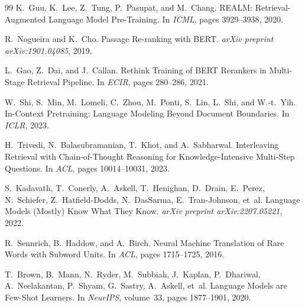 \documentclass[11pt,a4paper]{article}
\theoremstyle{plain}
\theoremstyle{definition}
\begin{document}
\begin{thebibliography}{99}
K.~Guu, K.~Lee, Z.~Tung, P.~Pasupat, and M.~Chang.
\newblock REALM: Retrieval-Augmented Language Model Pre-Training.
\newblock In \emph{ICML}, pages 3929--3938, 2020.

R.~Nogueira and K.~Cho.
\newblock Passage Re-ranking with BERT.
\newblock \emph{arXiv preprint arXiv:1901.04085}, 2019.

L.~Gao, Z.~Dai, and J.~Callan.
\newblock Rethink Training of BERT Rerankers in Multi-Stage Retrieval Pipeline.
\newblock In \emph{ECIR}, pages 280--286, 2021.

W.~Shi, S.~Min, M.~Lomeli, C.~Zhou, M.~Ponti, S.~Lin, L.~Shi, and W.-t.~Yih.
\newblock In-Context Pretraining: Language Modeling Beyond Document Boundaries.
\newblock In \emph{ICLR}, 2023.

H.~Trivedi, N.~Balasubramanian, T.~Khot, and A.~Sabharwal.
\newblock Interleaving Retrieval with Chain-of-Thought Reasoning for Knowledge-Intensive Multi-Step Questions.
\newblock In \emph{ACL}, pages 10014--10031, 2023.

S.~Kadavath, T.~Conerly, A.~Askell, T.~Henighan, D.~Drain, E.~Perez, 
N.~Schiefer, Z.~Hatfield-Dodds, N.~DasSarma, E.~Tran-Johnson, et~al.
\newblock Language Models (Mostly) Know What They Know.
\newblock \emph{arXiv preprint arXiv:2207.05221}, 2022.

R.~Sennrich, B.~Haddow, and A.~Birch.
\newblock Neural Machine Translation of Rare Words with Subword Units.
\newblock In \emph{ACL}, pages 1715--1725, 2016.

T.~Brown, B.~Mann, N.~Ryder, M.~Subbiah, J.~Kaplan, P.~Dhariwal, 
A.~Neelakantan, P.~Shyam, G.~Sastry, A.~Askell, et~al.
\newblock Language Models are Few-Shot Learners.
\newblock In \emph{NeurIPS}, volume~33, pages 1877--1901, 2020.

\end{thebibliography}
\end{document}
